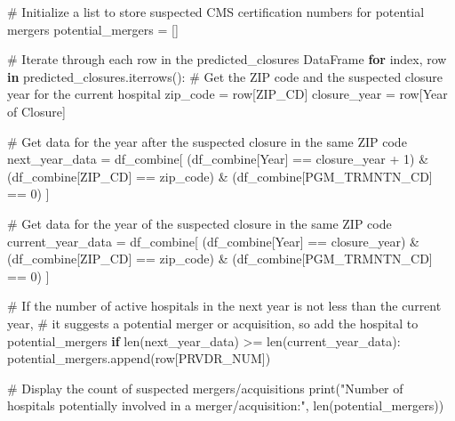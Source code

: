 \documentclass[
  letterpaper,
  DIV=11,
  numbers=noendperiod]{scrartcl}
\newenvironment{Shaded}{\begin{snugshade}}{\end{snugshade}}
\newcommand{\BuiltInTok}[1]{\textcolor[rgb]{0.00,0.23,0.31}{#1}}
\newcommand{\CommentTok}[1]{\textcolor[rgb]{0.37,0.37,0.37}{#1}}
\newcommand{\ControlFlowTok}[1]{\textcolor[rgb]{0.00,0.23,0.31}{\textbf{#1}}}
\newcommand{\DecValTok}[1]{\textcolor[rgb]{0.68,0.00,0.00}{#1}}
\newcommand{\KeywordTok}[1]{\textcolor[rgb]{0.00,0.23,0.31}{\textbf{#1}}}
\newcommand{\NormalTok}[1]{\textcolor[rgb]{0.00,0.23,0.31}{#1}}
\newcommand{\OperatorTok}[1]{\textcolor[rgb]{0.37,0.37,0.37}{#1}}
\newcommand{\StringTok}[1]{\textcolor[rgb]{0.13,0.47,0.30}{#1}}
\begin{document}
\begin{Shaded}
\begin{Highlighting}[]
\CommentTok{\# Initialize a list to store suspected CMS certification numbers for potential mergers}
\NormalTok{potential\_mergers }\OperatorTok{=}\NormalTok{ []}

\CommentTok{\# Iterate through each row in the predicted\_closures DataFrame}
\ControlFlowTok{for}\NormalTok{ index, row }\KeywordTok{in}\NormalTok{ predicted\_closures.iterrows():}
    \CommentTok{\# Get the ZIP code and the suspected closure year for the current hospital}
\NormalTok{    zip\_code }\OperatorTok{=}\NormalTok{ row[}\StringTok{\textquotesingle{}ZIP\_CD\textquotesingle{}}\NormalTok{]}
\NormalTok{    closure\_year }\OperatorTok{=}\NormalTok{ row[}\StringTok{\textquotesingle{}Year of Closure\textquotesingle{}}\NormalTok{]}
    
    \CommentTok{\# Get data for the year after the suspected closure in the same ZIP code}
\NormalTok{    next\_year\_data }\OperatorTok{=}\NormalTok{ df\_combine[}
\NormalTok{        (df\_combine[}\StringTok{\textquotesingle{}Year\textquotesingle{}}\NormalTok{] }\OperatorTok{==}\NormalTok{ closure\_year }\OperatorTok{+} \DecValTok{1}\NormalTok{) }\OperatorTok{\&} 
\NormalTok{        (df\_combine[}\StringTok{\textquotesingle{}ZIP\_CD\textquotesingle{}}\NormalTok{] }\OperatorTok{==}\NormalTok{ zip\_code) }\OperatorTok{\&} 
\NormalTok{        (df\_combine[}\StringTok{\textquotesingle{}PGM\_TRMNTN\_CD\textquotesingle{}}\NormalTok{] }\OperatorTok{==} \DecValTok{0}\NormalTok{)}
\NormalTok{    ]}
    
    \CommentTok{\# Get data for the year of the suspected closure in the same ZIP code}
\NormalTok{    current\_year\_data }\OperatorTok{=}\NormalTok{ df\_combine[}
\NormalTok{        (df\_combine[}\StringTok{\textquotesingle{}Year\textquotesingle{}}\NormalTok{] }\OperatorTok{==}\NormalTok{ closure\_year) }\OperatorTok{\&} 
\NormalTok{        (df\_combine[}\StringTok{\textquotesingle{}ZIP\_CD\textquotesingle{}}\NormalTok{] }\OperatorTok{==}\NormalTok{ zip\_code) }\OperatorTok{\&} 
\NormalTok{        (df\_combine[}\StringTok{\textquotesingle{}PGM\_TRMNTN\_CD\textquotesingle{}}\NormalTok{] }\OperatorTok{==} \DecValTok{0}\NormalTok{)}
\NormalTok{    ]}
    
    \CommentTok{\# If the number of active hospitals in the next year is not less than the current year,}
    \CommentTok{\# it suggests a potential merger or acquisition, so add the hospital to potential\_mergers}
    \ControlFlowTok{if} \BuiltInTok{len}\NormalTok{(next\_year\_data) }\OperatorTok{\textgreater{}=} \BuiltInTok{len}\NormalTok{(current\_year\_data):}
\NormalTok{        potential\_mergers.append(row[}\StringTok{\textquotesingle{}PRVDR\_NUM\textquotesingle{}}\NormalTok{])}


\CommentTok{\# Display the count of suspected mergers/acquisitions}
\BuiltInTok{print}\NormalTok{(}\StringTok{"Number of hospitals potentially involved in a merger/acquisition:"}\NormalTok{, }\BuiltInTok{len}\NormalTok{(potential\_mergers))}
\end{Highlighting}
\end{Shaded}
\end{document}
